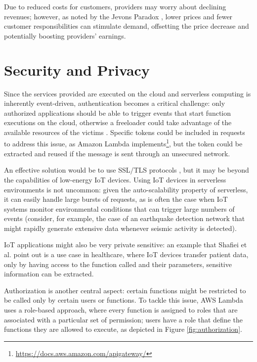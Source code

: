 \documentclass[
	a4paper, %
	12pt,
	twoside, %
]{LTJournalArticle}
\begin{document}
Due to reduced costs for customers, providers may worry about declining revenues; however, as noted by the Jevons Paradox \cite{alcott_jevons_2005}, lower prices and fewer customer responsibilities can stimulate demand, offsetting the price decrease and potentially boosting providers’ earnings. 

\section{Security and Privacy}
Since the services provided are executed on the cloud and serverless computing is inherently event-driven, authentication becomes a critical challenge: only authorized applications should be able to trigger events that start function executions on the cloud, otherwise a freeloader could take advantage of the available resources of the victims \cite{shafiei_serverless_2022}. Specific tokens could be included in requests to address this issue, as Amazon Lambda implements\footnote{\url{https://docs.aws.amazon.com/apigateway/}}, but the token could be extracted and reused if the message is sent through an unsecured network. 

An effective solution would be to use SSL/TLS protocols \cite{freier_secure_2011, rescorla_transport_2018}, but it may be beyond the capabilities of low-energy IoT devices. Using IoT devices in serverless environments is not uncommon: given the auto-scalability property of serverless, it can easily handle large bursts of requests, as is often the case when IoT systems monitor environmental conditions that can trigger large numbers of events (consider, for example, the case of an earthquake detection network that might rapidly generate extensive data whenever seismic activity is detected).

IoT applications might also be very private sensitive: an example that Shafiei et al. \cite{shafiei_serverless_2022} point out is a use case in healthcare, where IoT devices transfer patient data, only by having access to the function called and their parameters, sensitive information can be extracted. 

Authorization is another central aspect: certain functions might be restricted to be called only by certain users or functions. To tackle this issue, AWS Lambda uses a role-based approach, where every function is assigned to roles that are associated with a particular set of permission; users have a role that define the functions they are allowed to execute, as depicted in Figure \ref{fig:authorization}. 
\end{document}
